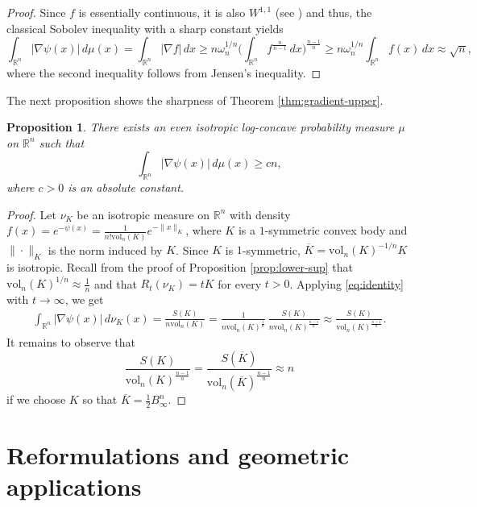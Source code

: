 \documentclass[11pt,leqno]{article}
\newtheorem{proposition}[theorem]{Proposition}
\theoremstyle{definition}
\theoremstyle{remark}
\numberwithin{equation}{section}
\newcommand{\gr}{\geqslant}
\newcommand{\1}{\textbf{1}}
\newcommand{\R}{\mathbb{R}}
\newcommand{\vol}{\mathrm{vol}}
\begin{document}
\begin{proof}
Since $f$ is essentially continuous, it is also $W^{1,1}$ (see \cite[Remark~3.3]{Rotem-2022}) and thus, the classical Sobolev inequality with a sharp constant yields
$$\int_{\mathbb{R}^n} |\nabla \psi(x)|\,d\mu(x) = \int_{\R^n} |\nabla f|\, dx \geq n\omega_n^{1/n} \bigg(\int_{\R^n} f^{\frac{n}{n-1}}\, dx \bigg)^{\frac{n-1}{n}} \geq n\omega_n^{1/n} \int_{\R^n} f(x)\, dx \approx \sqrt{n},$$
where the second inequality follows from Jensen's inequality.
\end{proof}


The next proposition shows the sharpness of Theorem \ref{thm:gradient-upper}.

\begin{proposition}\label{prop:lower-n}There exists an even isotropic log-concave probability measure $\mu$ on $\mathbb{R}^n$ such that
$$\int_{\mathbb{R}^n}|\nabla \psi(x)|\,d\mu(x)\gr cn,$$
where $c>0$ is an absolute constant.
\end{proposition}

\begin{proof}Let $\nu_K$ be an isotropic measure on $\mathbb{R}^n$ with density $f(x)=e^{-\psi(x)}=\frac{1}{n!\vol_n(K)}e^{-\|x\|_K}$, where $K$ is a $1$-symmetric convex body
and $\|\cdot\|_K$ is the norm induced by $K$. Since $K$ is $1$-symmetric,  $\overline{K}=\vol_n(K)^{-1/n}K$ is isotropic. Recall from the proof of Proposition \ref{prop:lower-sup} that $\vol_n(K)^{1/n}\approx \frac{1}{n}$ and that $R_t(\nu_K)=tK$ for every $t>0$. Applying \eqref{eq:identity} with $t\to\infty$, we get
\begin{align*}
\int_{\mathbb{R}^n}|\nabla \psi(x)|\,d\nu_K(x) 
=\frac{S(K)}{n\vol_n(K)} =\frac{1}{n\vol_n(K)^{\frac{1}{n}}}\,\frac{S(K)}{n\vol_n(K)^{\frac{n-1}{n}}}\approx \frac{S(K)}{\vol_n(K)^{\frac{n-1}{n}}}.
\end{align*}
It remains to observe that
$$\frac{S(K)}{\vol_n(K)^{\frac{n-1}{n}}}=\frac{S(\overline{K})}{\vol_n(\overline{K})^{\frac{n-1}{n}}}\approx n$$
if we choose $K$ so that $\overline{K}=\frac{1}{2}B_{\infty}^n$.
\end{proof}

\section{Reformulations and geometric applications}\label{section:6}
\end{document}
